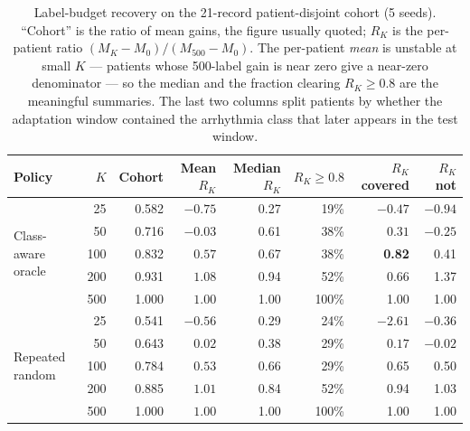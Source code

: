 \begin{table}[H]
\centering
\small
\caption{Label-budget recovery on the 21-record patient-disjoint cohort (5 seeds).
``Cohort'' is the ratio of mean gains, the figure usually quoted; $R_K$ is the
per-patient ratio $(M_K - M_0)/(M_{500} - M_0)$. The per-patient \emph{mean} is
unstable at small $K$ --- patients whose 500-label gain is near zero give a
near-zero denominator --- so the median and the fraction clearing $R_K \ge 0.8$
are the meaningful summaries. The last two columns split patients by whether the
adaptation window contained the arrhythmia class that later appears in the test
window.}
\label{tab:recovery}
\setlength{\tabcolsep}{5pt}
\begin{tabular}{lrrrrrrr}
\toprule
Policy & $K$ & Cohort & Mean $R_K$ & Median $R_K$ & $R_K \ge 0.8$ & $R_K$ covered & $R_K$ not \\
\midrule
\multirow{5}{*}{Class-aware oracle}
 & 25  & 0.582 & $-0.75$ & 0.27 & 19\% & $-0.47$ & $-0.94$ \\
 & 50  & 0.716 & $-0.03$ & 0.61 & 38\% & $0.31$  & $-0.25$ \\
 & 100 & 0.832 & $0.57$  & 0.67 & 38\% & \textbf{0.82} & 0.41 \\
 & 200 & 0.931 & $1.08$  & 0.94 & 52\% & $0.66$  & 1.37 \\
 & 500 & 1.000 & $1.00$  & 1.00 & 100\% & 1.00   & 1.00 \\
\midrule
\multirow{5}{*}{Repeated random}
 & 25  & 0.541 & $-0.56$ & 0.29 & 24\% & $-2.61$ & $-0.36$ \\
 & 50  & 0.643 & $0.02$  & 0.38 & 29\% & $0.17$  & $-0.02$ \\
 & 100 & 0.784 & $0.53$  & 0.66 & 29\% & 0.65    & 0.50 \\
 & 200 & 0.885 & $1.01$  & 0.84 & 52\% & 0.94    & 1.03 \\
 & 500 & 1.000 & $1.00$  & 1.00 & 100\% & 1.00   & 1.00 \\
\bottomrule
\end{tabular}
\end{table}
